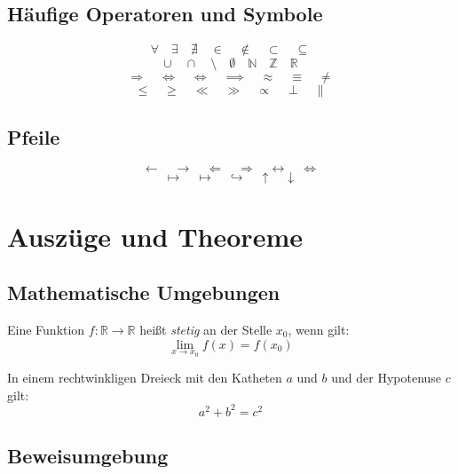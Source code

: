 \section{Häufige Operatoren und Symbole}

\[
    \forall \quad \exists \quad \nexists \quad \in \quad \notin \quad \subset \quad \subseteq
\]
\[
    \cup \quad \cap \quad \setminus \quad \emptyset \quad \mathbb{N} \quad \mathbb{Z} \quad \mathbb{R}
\]
\[
    \Rightarrow \quad \Leftrightarrow \quad \iff \quad \implies \quad \approx \quad \equiv \quad \neq
\]
\[
    \leq \quad \geq \quad \ll \quad \gg \quad \propto \quad \perp \quad \parallel
\]

\section{Pfeile}

\[
    \leftarrow \quad \rightarrow \quad \Leftarrow \quad \Rightarrow \quad
    \leftrightarrow \quad \Leftrightarrow
\]
\[
    \mapsto \quad \longmapsto \quad \hookrightarrow \quad \uparrow \quad \downarrow
\]

\chapter{Auszüge und Theoreme}
\label{sec:theoreme}

\section{Mathematische Umgebungen}

\begin{definition}
Eine Funktion $f\colon \mathbb{R} \to \mathbb{R}$ heißt \emph{stetig}
an der Stelle $x_0$, wenn gilt:
\[
    \lim_{x \to x_0} f(x) = f(x_0)
\]
\end{definition}

\begin{satz}
In einem rechtwinkligen Dreieck mit den Katheten $a$ und $b$ und der
Hypotenuse $c$ gilt:
\begin{equation}
    a^2 + b^2 = c^2
\end{equation}
\end{satz}

\section{Beweisumgebung}


